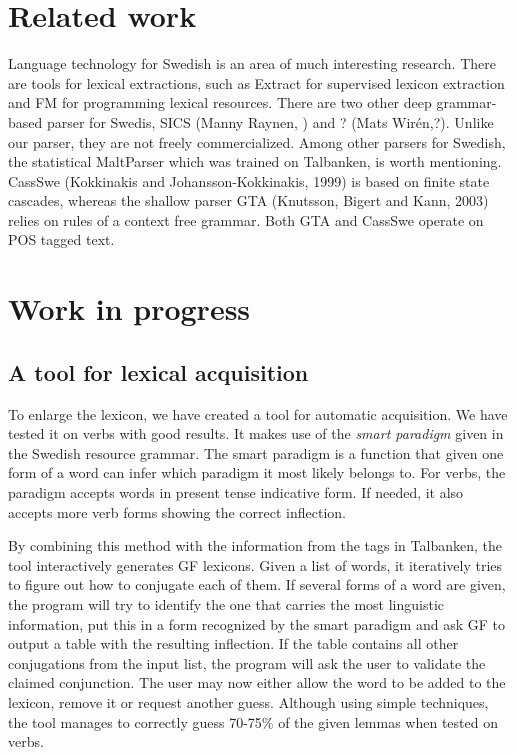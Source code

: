 \documentclass[submission]{eptcs} %
\begin{document}
\section{Related work}
Language technology for Swedish is an area of much interesting research.
There are tools for lexical extractions, such as
Extract for supervised lexicon extraction and
FM\cite{MarkusForsberg2007} for programming lexical resources.
There are two other deep grammar-based parser for Swedis,
SICS (Manny Raynen, ) and ? (Mats Wirén,?). Unlike our parser, 
they are not freely commercialized.
Among other parsers for Swedish, the statistical MaltParser\cite{malt}
which was trained on Talbanken, is worth mentioning. 
CassSwe (Kokkinakis and Johansson-Kokkinakis, 1999) is based on finite state cascades,
whereas the shallow parser GTA (Knutsson, Bigert and Kann, 2003) relies on rules of 
a context free grammar. Both GTA and CassSwe operate on POS tagged text.


\section{Work in progress}
\label{sec:progress}
\subsection{A tool for lexical acquisition}
To enlarge the lexicon, 
we have created a tool for automatic acquisition. We have
tested it on verbs with good results. It makes use of
the \emph{smart paradigm} given in the Swedish resource grammar.
The smart paradigm is a function that given one form of a word can
infer which paradigm it most likely belongs to.
For verbs, the paradigm accepts words in present tense indicative form.
If needed, it also accepts more verb forms showing the correct inflection.

By combining this method with the information from the tags in Talbanken,
the tool interactively generates GF lexicons. 
Given a list of words, it iteratively
tries to figure out how to conjugate each of them. If several forms of a word are 
given, the program will try to identify the one that carries the most linguistic
information, put this in a form recognized by the smart paradigm and ask GF to output
a table with the resulting inflection. 
If the table contains all other conjugations from the input list,
the program will ask the  user to
validate the claimed conjunction. The user may now either
allow the word to be added to the lexicon, remove it or request another guess.
Although using simple techniques, the tool 
manages to correctly guess 70-75\% of the given lemmas when tested on
verbs.\\
\end{document}
